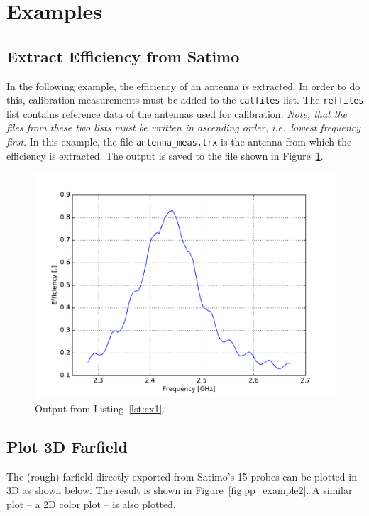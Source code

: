 \section{Examples}

\subsection{Extract Efficiency from Satimo}
In the following example, the efficiency of an antenna is extracted. In order to do this, calibration measurements must be added to the \texttt{calfiles} list. The \texttt{reffiles} list contains reference data of the antennas used for calibration. \emph{Note, that the files from these two lists must be written in ascending order, i.e.\ lowest frequency first}. In this example, the file \texttt{antenna\_meas.trx} is the antenna from which the efficiency is extracted. The output is saved to the file shown in Figure~\ref{fig:pp_example1}.



\begin{figure}[htbp]
    \centering
    \includegraphics[scale=0.5]{sec/post_processing/examples/ex1_efficiency.pdf}
    \caption{Output from Listing~\ref{lst:ex1}.}
    \label{fig:pp_example1}
\end{figure}


\subsection{Plot 3D Farfield}
The (rough) farfield directly exported from Satimo's 15 probes can be plotted in 3D as shown below. The result is shown in Figure~\ref{fig:pp_example2}. A similar plot -- a 2D color plot -- is also plotted.

